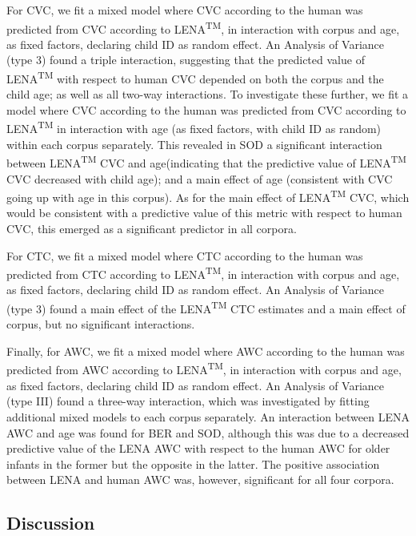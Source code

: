 \documentclass[english,table,man,floatsintext]{apa6}
\begin{document}
For CVC, we fit a mixed model where CVC according to the human was predicted from CVC according to LENA\textsuperscript{TM}, in interaction with corpus and age, as fixed factors, declaring child ID as random effect. An Analysis of Variance (type 3) found a triple interaction, suggesting that the predicted value of LENA\textsuperscript{TM} with respect to human CVC depended on both the corpus and the child age; as well as all two-way interactions. To investigate these further, we fit a model where CVC according to the human was predicted from CVC according to LENA\textsuperscript{TM} in interaction with age (as fixed factors, with child ID as random) within each corpus separately. This revealed in SOD a significant interaction between LENA\textsuperscript{TM} CVC and age(indicating that the predictive value of LENA\textsuperscript{TM} CVC decreased with child age); and a main effect of age (consistent with CVC going up with age in this corpus). As for the main effect of LENA\textsuperscript{TM} CVC, which would be consistent with a predictive value of this metric with respect to human CVC, this emerged as a significant predictor in all corpora.

For CTC, we fit a mixed model where CTC according to the human was predicted from CTC according to LENA\textsuperscript{TM}, in interaction with corpus and age, as fixed factors, declaring child ID as random effect. An Analysis of Variance (type 3) found a main effect of the LENA\textsuperscript{TM} CTC estimates and a main effect of corpus, but no significant interactions.

Finally, for AWC, we fit a mixed model where AWC according to the human was predicted from AWC according to LENA\textsuperscript{TM}, in interaction with corpus and age, as fixed factors, declaring child ID as random effect. An Analysis of Variance (type III) found a three-way interaction, which was investigated by fitting additional mixed models to each corpus separately. An interaction between LENA AWC and age was found for BER and SOD, although this was due to a decreased predictive value of the LENA AWC with respect to the human AWC for older infants in the former but the opposite in the latter. The positive association between LENA and human AWC was, however, significant for all four corpora.

\hypertarget{discussion}{%
\subsection{Discussion}\label{discussion}}
\end{document}

